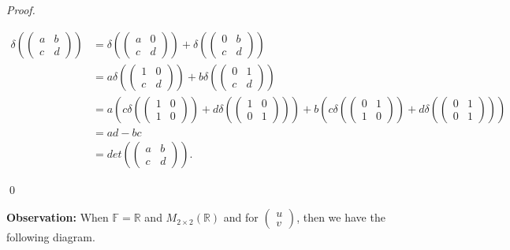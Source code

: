 \documentclass[12pt]{article}
\newenvironment{sol}
    {\emph{Proof.}
    }
    {
    \qed
    }
\begin{document}
\begin{sol}
\begin{align*}
        \delta \left( \begin{pmatrix}
    a & b \\ c & d
    \end{pmatrix} \right) &= \delta \left( \begin{pmatrix}
    a & 0 \\ c & d
    \end{pmatrix} \right) + \delta \left( \begin{pmatrix}
    0 & b \\ c & d
    \end{pmatrix} \right) \\
    &= a\delta \left( \begin{pmatrix}
    1 & 0 \\ c & d
    \end{pmatrix} \right) + b\delta \left( \begin{pmatrix}
    0 & 1 \\ c & d
    \end{pmatrix} \right) \\
    &= a \left( c\delta \left( \begin{pmatrix}
    1 & 0 \\ 1 & 0
    \end{pmatrix} \right) + d\delta \left( \begin{pmatrix}
    1 & 0 \\ 0 & 1
    \end{pmatrix} \right) \right) + b\left( c\delta \left( \begin{pmatrix}
    0 & 1 \\ 1 & 0
    \end{pmatrix} \right) + d\delta \left( \begin{pmatrix}
    0 & 1 \\ 0 & 1
    \end{pmatrix} \right) \right) \\
    &= ad - bc \\
    &= det\left( \begin{pmatrix}
    a & b \\ c & d
    \end{pmatrix} \right).
    \end{align*}
\end{sol}

\noindent\textbf{Observation:} When $\mathbb{F} = \mathbb{R}$ and $M_{2 \times 2}(\mathbb{R})$ and for $\begin{pmatrix}
u \\ v
\end{pmatrix}$, then we have the following diagram.
\end{document}
